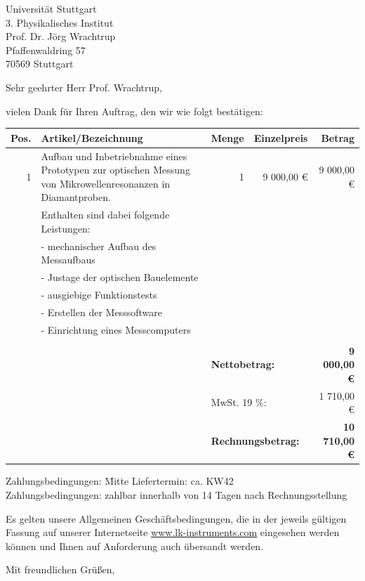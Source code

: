 \documentclass[DIN,
               paper=a4,
               fontsize=11pt,
               addrfield=on,
               enlargefirstpage=on,
               foldmarks=on,
               pagenumber=off,
               firsthead=on,
               firstfoot=on,
               parskip=full,
               addrfield=on,
               fromalign=right,
               fromemail=true,
               fromphone=true,
               fromurl=true,
               fromlogo=on,
               fromrule=off,
               numericaldate=off,
              ]{scrlttr2}
\begin{document}
\begin{letter}{Universität Stuttgart\\
               3. Physikalisches Institut\\
               Prof. Dr. Jörg Wrachtrup\\               
               Pfaffenwaldring 57\\
               70569 Stuttgart}
\opening{Sehr geehrter Herr Prof. Wrachtrup,}
vielen Dank für Ihren Auftrag, den wir wie folgt bestätigen:

\begin{tabular}{rp{7.5cm}rrr}
  \toprule
  \textbf{Pos.}&\textbf{Artikel/Bezeichnung}&\textbf{Menge}&\textbf{Einzelpreis}&\textbf{Betrag}\\
  \toprule
  1 & Aufbau und Inbetriebnahme eines Prototypen zur optischen Messung
	    von Mikrowellenresonanzen in Diamantproben. & 1 & 9 000,00 € & 9 000,00 € \\
	  & Enthalten sind dabei folgende Leistungen: & & & \\
	  & - mechanischer Aufbau des Messaufbaus & & & \\
	  & - Justage der optischen Bauelemente & & & \\
	  & - ausgiebige Funktionstests & & & \\
	  & - Erstellen der Messsoftware & & & \\
	  & - Einrichtung eines Messcomputers & & & \\
  \bottomrule
	  & & & & \\
	  & & \multicolumn{2}{l}{\textbf{Nettobetrag:}} & \textbf{9 000,00 €}\\
	  & & \multicolumn{2}{l}{MwSt. 19 \%:} & 1 710,00 €\\
	  & & \multicolumn{2}{l}{\textbf{Rechnungsbetrag:}} & \textbf{10 710,00 €}\\
\end{tabular}
\begin{tabbing}
Zahlungsbedingungen: \= Mitte \kill
Liefertermin:         \>ca. KW42\\
Zahlungsbedingungen:\> zahlbar innerhalb von 14 Tagen nach Rechnungsstellung
\end{tabbing}
Es gelten unsere Allgemeinen Geschäftsbedingungen, die in der jeweils
gültigen Fassung auf unserer Internetseite
\href{http://www.lk-instruments.com}{www.lk-instruments.com}
eingesehen werden können und Ihnen auf Anforderung auch übersandt werden.

\closing{Mit freundlichen Grüßen,}


\end{letter}
\end{document}
